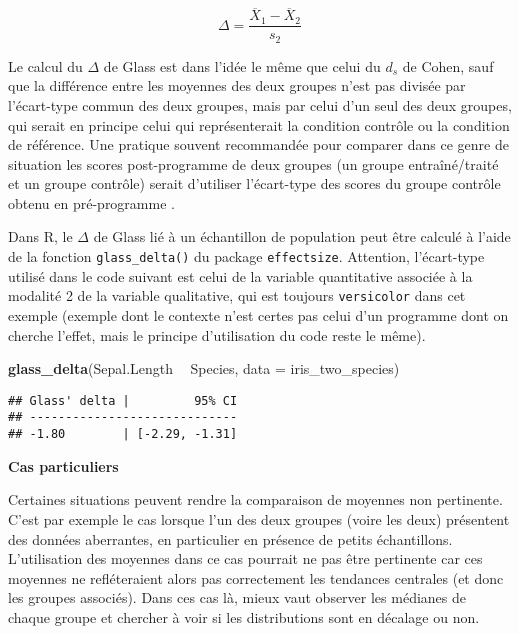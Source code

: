 \documentclass[
  french,
]{book}
\newenvironment{Shaded}{\begin{snugshade}}{\end{snugshade}}
\newcommand{\DataTypeTok}[1]{\textcolor[rgb]{0.13,0.29,0.53}{#1}}
\newcommand{\KeywordTok}[1]{\textcolor[rgb]{0.13,0.29,0.53}{\textbf{#1}}}
\newcommand{\NormalTok}[1]{#1}
\newcommand{\OperatorTok}[1]{\textcolor[rgb]{0.81,0.36,0.00}{\textbf{#1}}}
\newcommand{\StringTok}[1]{\textcolor[rgb]{0.31,0.60,0.02}{#1}}
\begin{document}
\[\Delta = \frac{\overline{X}_{1} - \overline{X}_{2}} {s_{2}}\]

Le calcul du \(\Delta\) de Glass est dans l'idée le même que celui du \(d_{s}\) de Cohen, sauf que la différence entre les moyennes des deux groupes n'est pas divisée par l'écart-type commun des deux groupes, mais par celui d'un seul des deux groupes, qui serait en principe celui qui représenterait la condition contrôle ou la condition de référence. Une pratique souvent recommandée pour comparer dans ce genre de situation les scores post-programme de deux groupes (un groupe entraîné/traité et un groupe contrôle) serait d'utiliser l'écart-type des scores du groupe contrôle obtenu en pré-programme \autocite{lakensCalculatingReportingEffect2013}.

Dans R, le \(\Delta\) de Glass lié à un échantillon de population peut être calculé à l'aide de la fonction \texttt{glass\_delta()} du package \texttt{effectsize}. Attention, l'écart-type utilisé dans le code suivant est celui de la variable quantitative associée à la modalité 2 de la variable qualitative, qui est toujours \texttt{versicolor} dans cet exemple (exemple dont le contexte n'est certes pas celui d'un programme dont on cherche l'effet, mais le principe d'utilisation du code reste le même).

\begin{Shaded}
\begin{Highlighting}[]
\KeywordTok{glass_delta}\NormalTok{(Sepal.Length }\OperatorTok{~}\StringTok{ }\NormalTok{Species, }
            \DataTypeTok{data =}\NormalTok{ iris_two_species)}
\end{Highlighting}
\end{Shaded}

\begin{verbatim}
## Glass' delta |         95% CI
## -----------------------------
## -1.80        | [-2.29, -1.31]
\end{verbatim}

\textbf{Cas particuliers}

Certaines situations peuvent rendre la comparaison de moyennes non pertinente. C'est par exemple le cas lorsque l'un des deux groupes (voire les deux) présentent des données aberrantes, en particulier en présence de petits échantillons. L'utilisation des moyennes dans ce cas pourrait ne pas être pertinente car ces moyennes ne refléteraient alors pas correctement les tendances centrales (et donc les groupes associés). Dans ces cas là, mieux vaut observer les médianes de chaque groupe et chercher à voir si les distributions sont en décalage ou non.
\end{document}
